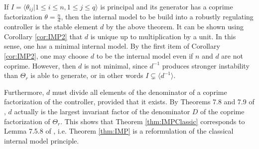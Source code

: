\documentclass[11pt, a4paper]{amsart}
\newcommand{\inv}{^{-1}}
\newcommand{\Gen}{\Theta}									%
\newcommand{\gen}{\theta}									%
\begin{document}
If $I=\langle \gen_{ij} | 1\leq i\leq n, 1\leq j\leq q\rangle$ is principal and its generator has a coprime factorization $\gen=\frac{n}{d}$, then the internal model to be build into a robustly regulating controller is the stable element $d$ by the above theorem. It can be shown using Corollary \ref{cor:IMP2} that $d$ is unique up to multiplication by a unit. In this sense, one has a minimal internal model. By the first item of Corollary \ref{cor:IMP2}, one may choose $d$ to be the internal model even if $n$ and $d$ are not coprime. However, then $d$ is not minimal, since $d\inv$ produces stronger instability than $\Gen_r$ is able to generate, or in other words $I\subsetneq\langle d\inv\rangle$.

Furthermore, $d$ must divide all elements of the denominator of a coprime factorization of the controller, provided that it exists. By Theorems 7.8 and 7.9 of \cite{Lang2002}, $d$ actually is the largest invariant factor of the denominator $D$ of the coprime factorization of $\Gen_r$. This shows that Theorem \ref{thm:IMPClassic} corresponds to Lemma 7.5.8 of \cite{Vidyasagar}, i.e. Theorem \ref{thm:IMP} is a reformulation of the classical internal model principle.
\end{document}
